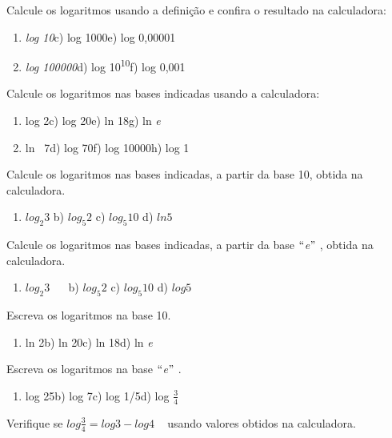 \begin{exercicios}
    \exitem{} Calcule os logaritmos usando a definição e confira o resultado na calculadora:
    \begin{enumerate}
	    \item \textit{log 10\quad \quad \quad }c) log 1000\quad \quad e) log 0,00001

	    \item \textit{log 100000\quad \quad }d) log 10\textsuperscript{10\quad \quad }f) log 0,001\quad 
    \end{enumerate}

	\exitem{} Calcule os logaritmos nas bases indicadas usando a calculadora:
    \begin{enumerate}
	    \item log 2\quad \quad c) log 20\quad e) ln 18\quad g) ln \textit{e}

	    \item ln~ 7\quad \quad d) log 70\quad f) log 10000\quad h) log 1
    \end{enumerate}

	\exitem{} Calcule os logaritmos nas bases indicadas, a partir da base 10, obtida na calculadora.
    \begin{enumerate}
	    \item  \( log_{2}3 \) \quad \quad b)  \( log_{5}2 \) \quad c)  \( log_{5}10 \) \quad d)  \( ln5 \) 
    \end{enumerate}

	\exitem{} Calcule os logaritmos nas bases indicadas, a partir da base $``$\textit{e}$"$ , obtida na calculadora.
    \begin{enumerate}
	    \item  \( log_{2}3 \) ~~ \quad \quad b)  \( log_{5}2 \) \quad c)  \( log_{5}10 \) \quad d)  \( log5 \) 
    \end{enumerate}

	\exitem{} Escreva os logaritmos na base 10. 
    \begin{enumerate}
	    \item ln 2\quad \quad b) ln 20\quad c) ln 18\quad d) ln \textit{e}
    \end{enumerate}

	\exitem{} Escreva os logaritmos na base $``$\textit{e}$"$ . 
    \begin{enumerate}
	    \item log 25\quad \quad b) log 7\quad c) log 1/5\quad d) log $\frac{3}{4}$
    \end{enumerate}

	\exitem{} Verifique se  \( log\frac{3}{4}=log3-log4 \) ~ usando valores obtidos na calculadora.
\end{exercicios}

